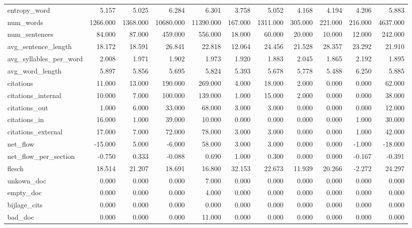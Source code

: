 \begin{tabular}{lrrrrrrrrrr}
\cline{1-11}
entropy\_word & 5.157 & 5.025 & 6.284 & 6.301 & 3.758 & 5.052 & 4.168 & 4.194 & 4.206 & 5.883 \\
\cline{1-11}
num\_words & 1266.000 & 1368.000 & 10680.000 & 11390.000 & 167.000 & 1311.000 & 305.000 & 221.000 & 216.000 & 4637.000 \\
\cline{1-11}
num\_sentences & 84.000 & 87.000 & 459.000 & 556.000 & 18.000 & 60.000 & 20.000 & 10.000 & 12.000 & 242.000 \\
\cline{1-11}
avg\_sentence\_length & 18.172 & 18.591 & 26.841 & 22.818 & 12.064 & 24.456 & 21.528 & 28.357 & 23.292 & 21.910 \\
\cline{1-11}
avg\_syllables\_per\_word & 2.008 & 1.971 & 1.902 & 1.973 & 1.920 & 1.883 & 2.045 & 1.865 & 2.192 & 1.895 \\
\cline{1-11}
avg\_word\_length & 5.897 & 5.856 & 5.695 & 5.824 & 5.393 & 5.678 & 5.778 & 5.488 & 6.250 & 5.885 \\
\cline{1-11}
citations & 11.000 & 13.000 & 190.000 & 269.000 & 4.000 & 18.000 & 2.000 & 0.000 & 0.000 & 62.000 \\
\cline{1-11}
citations\_internal & 10.000 & 7.000 & 100.000 & 139.000 & 1.000 & 15.000 & 2.000 & 0.000 & 0.000 & 38.000 \\
\cline{1-11}
citations\_out & 1.000 & 6.000 & 33.000 & 68.000 & 3.000 & 3.000 & 0.000 & 0.000 & 0.000 & 12.000 \\
\cline{1-11}
citations\_in & 16.000 & 1.000 & 39.000 & 10.000 & 0.000 & 0.000 & 0.000 & 0.000 & 1.000 & 30.000 \\
\cline{1-11}
citations\_external & 17.000 & 7.000 & 72.000 & 78.000 & 3.000 & 3.000 & 0.000 & 0.000 & 1.000 & 42.000 \\
\cline{1-11}
net\_flow & -15.000 & 5.000 & -6.000 & 58.000 & 3.000 & 3.000 & 0.000 & 0.000 & -1.000 & -18.000 \\
\cline{1-11}
net\_flow\_per\_section & -0.750 & 0.333 & -0.088 & 0.690 & 1.000 & 0.300 & 0.000 & 0.000 & -0.167 & -0.391 \\
\cline{1-11}
flesch & 18.514 & 21.207 & 18.691 & 16.800 & 32.153 & 22.673 & 11.939 & 20.266 & -2.272 & 24.297 \\
\cline{1-11}
unkown\_doc & 0.000 & 0.000 & 0.000 & 7.000 & 0.000 & 0.000 & 0.000 & 0.000 & 0.000 & 0.000 \\
\cline{1-11}
empty\_doc & 0.000 & 0.000 & 0.000 & 4.000 & 0.000 & 0.000 & 0.000 & 0.000 & 0.000 & 0.000 \\
\cline{1-11}
bijlage\_cits & 0.000 & 0.000 & 0.000 & 0.000 & 0.000 & 0.000 & 0.000 & 0.000 & 0.000 & 0.000 \\
\cline{1-11}
bad\_doc & 0.000 & 0.000 & 0.000 & 11.000 & 0.000 & 0.000 & 0.000 & 0.000 & 0.000 & 0.000 \\
\cline{1-11}
\bottomrule
\end{tabular}
